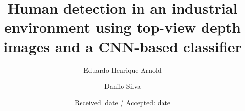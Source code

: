 \documentclass[twocolumn]{svjour3}
\begin{document}
\title{Human detection in an industrial environment using top-view depth images and a CNN-based classifier}
%
\author{Eduardo Henrique Arnold \and Danilo Silva}



\date{Received: date / Accepted: date}

\maketitle






\nocite{*}







\end{document}
